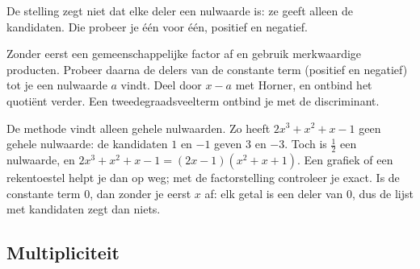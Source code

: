 De stelling zegt niet dat elke deler een nulwaarde is: ze geeft alleen de kandidaten. Die probeer je één voor één, positief en negatief.


\begin{werkwijze}
Zonder eerst een gemeenschappelijke factor af en gebruik merkwaardige producten. Probeer daarna de delers van de constante term (positief en negatief) tot je een nulwaarde $a$ vindt. Deel door $x - a$ met Horner, en ontbind het quotiënt verder. Een tweedegraadsveelterm ontbind je met de discriminant.
\end{werkwijze}

De methode vindt alleen gehele nulwaarden. Zo heeft $2x^3 + x^2 + x - 1$ geen gehele nulwaarde: de kandidaten $1$ en $-1$ geven $3$ en $-3$. Toch is $\frac12$ een nulwaarde, en $2x^3 + x^2 + x - 1 = (2x - 1)(x^2 + x + 1)$. Een grafiek of een rekentoestel helpt je dan op weg; met de factorstelling controleer je exact. Is de constante term $0$, dan zonder je eerst $x$ af: elk getal is een deler van $0$, dus de lijst met kandidaten zegt dan niets.

\begin{oefeningen}

\end{oefeningen}

\subsection{Multipliciteit}

